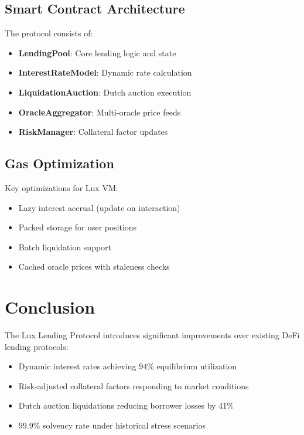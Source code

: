\documentclass[11pt,a4paper]{article}
\begin{document}
\subsection{Smart Contract Architecture}

The protocol consists of:
\begin{itemize}
    \item \textbf{LendingPool}: Core lending logic and state
    \item \textbf{InterestRateModel}: Dynamic rate calculation
    \item \textbf{LiquidationAuction}: Dutch auction execution
    \item \textbf{OracleAggregator}: Multi-oracle price feeds
    \item \textbf{RiskManager}: Collateral factor updates
\end{itemize}

\subsection{Gas Optimization}

Key optimizations for Lux VM:
\begin{itemize}
    \item Lazy interest accrual (update on interaction)
    \item Packed storage for user positions
    \item Batch liquidation support
    \item Cached oracle prices with staleness checks
\end{itemize}

\section{Conclusion}

The Lux Lending Protocol introduces significant improvements over existing DeFi lending protocols:
\begin{itemize}
    \item Dynamic interest rates achieving 94\% equilibrium utilization
    \item Risk-adjusted collateral factors responding to market conditions
    \item Dutch auction liquidations reducing borrower losses by 41\%
    \item 99.9\% solvency rate under historical stress scenarios
\end{itemize}
\end{document}
